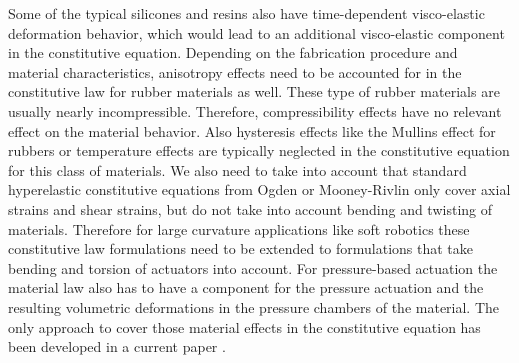 Some of the typical silicones and resins also have time-dependent visco-elastic deformation behavior, which would lead to an additional visco-elastic component in the constitutive
 equation. Depending on the fabrication procedure and material characteristics, anisotropy effects need to be accounted for in the constitutive law for rubber materials as well.
These type of rubber materials are usually nearly incompressible. Therefore, compressibility effects have no relevant effect
on the material behavior. Also hysteresis effects like the Mullins effect for rubbers or temperature effects are typically neglected in the constitutive equation for this class
 of materials.
We also need to take into account that standard hyperelastic constitutive equations from Ogden \cite{Ogden1997_book} or Mooney-Rivlin only cover axial strains and shear strains, but do
not take into account bending and twisting of materials. Therefore for large curvature applications like soft robotics these constitutive law formulations need to be extended to
formulations that take bending and torsion of actuators into account. For pressure-based actuation the material law also has to have a component for the pressure actuation and the resulting
volumetric deformations in the pressure chambers of the material. The only approach to cover those material effects in the constitutive equation has been developed in a current paper \cite{Eugster2022}.

